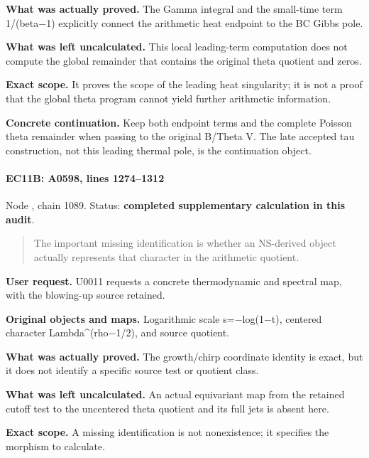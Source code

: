\textbf{What was actually proved.} The Gamma integral and the small-time
term 1/(beta\allowbreak{}\ensuremath{−}\allowbreak{}1) explicitly
connect the arithmetic heat endpoint to the BC Gibbs pole.

\textbf{What was left uncalculated.} This local leading-term computation
does not compute the global remainder that contains the original theta
quotient and zeros.

\textbf{Exact scope.} It proves the scope of the leading heat
singularity; it is not a proof that the global theta program cannot
yield further arithmetic information.

\textbf{Concrete continuation.} Keep both endpoint terms and the
complete Poisson theta remainder when passing to the original B/Theta V.
The late accepted tau construction, not this leading thermal pole, is
the continuation object.

\paragraph{EC11B: A0598, lines
1274--1312}\label{ec11b-a0598-lines-12741312}

Node \protect{}, chain 1089.
Status: \textbf{completed supplementary calculation in this audit}.

\begin{quote}
The important missing identification is whether an NS-derived object
actually represents that character in the arithmetic quotient.
\end{quote}

\textbf{User request.} U0011 requests a concrete thermodynamic and
spectral map, with the blowing-up source retained.

\textbf{Original objects and maps.} Logarithmic scale
s=\allowbreak{}\ensuremath{−}\allowbreak{}log(1\allowbreak{}\ensuremath{−}\allowbreak{}t),
centered character
Lambda\textasciicircum{}(rho\allowbreak{}\ensuremath{−}\allowbreak{}1/2),
and source quotient.

\textbf{What was actually proved.} The growth/chirp coordinate identity
is exact, but it does not identify a specific source test or quotient
class.

\textbf{What was left uncalculated.} An actual equivariant map from the
retained cutoff test to the uncentered theta quotient and its full jets
is absent here.

\textbf{Exact scope.} A missing identification is not nonexistence; it
specifies the morphism to calculate.

